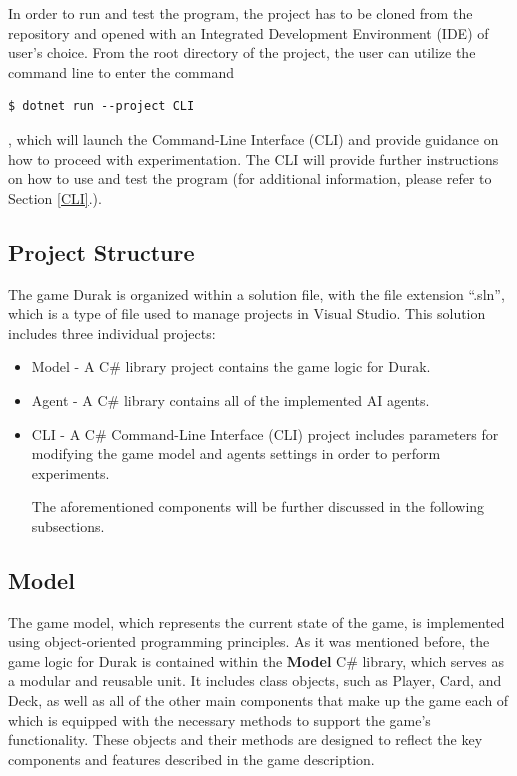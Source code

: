 In order to run and test the program, the project has to be cloned from the repository and opened with an Integrated Development Environment (IDE) of user's choice. From the root directory of the project, the user can utilize the command line to enter the command 
\begin{lstlisting}[frame=single]
$ dotnet run --project CLI
\end{lstlisting}
, which will launch the Command-Line Interface (CLI) and provide guidance on how to proceed with experimentation. The CLI will provide further instructions on how to use and test the program (for additional information, please refer to Section \ref{CLI}.).

\subsection{Project Structure}
The game Durak is organized within a solution file, with the file extension ``.sln'', which is a type of file used to manage projects in Visual Studio. This solution includes three individual projects: 

\begin{itemize}

\item Model - A C\# library project contains the game logic for Durak.

\item Agent - A C\# library contains all of the implemented AI agents.

\item CLI - A C\# Command-Line Interface (CLI) project includes parameters for modifying the game model and agents settings in order to perform experiments.

The aforementioned components will be further discussed in the following subsections.

\end{itemize}

\subsection{Model}

The game model, which represents the current state of the game, is implemented using object-oriented programming principles. As it was mentioned before, the game logic for Durak is contained within the \textbf{Model} C\# library, which serves as a modular and reusable unit. It includes class objects, such as Player, Card, and Deck, as well as all of the other main components that make up the game each of which is equipped with the necessary methods to support the game's functionality. These objects and their methods are designed to reflect the key components and features described in the game description.

